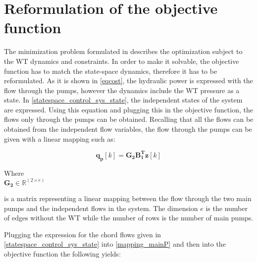 \section{Reformulation of the objective function}
\label{ObjFunc_reform}

The minimization problem formulated in  describes the optimization subject to the WT dynamics and constraints. In order to make it solvable, the objective function has to match the state-space dynamics, therefore it has to be reformulated. As it is shown in \eqref{eqcost}, the hydraulic power is expressed with the flow through the pumps, however the dynamics include the WT pressure as a state. In \eqref{statespace_control_sys_state}, the independent states of the system are expressed. Using this equation and plugging this in the objective function, the flows only through the pumps can be obtained. Recalling that all the flows can be obtained from the independent flow variables, the flow through the pumps can be given with a linear mapping such as: 

\begin{equation}
\bm{q_p}[k]  = \bm{G_{2}} \bm{B_{1}^T}  \bm{z}[k]
\label{mapping_mainP}
\end{equation}


\begin{minipage}[t]{0.20\textwidth}
Where\\
\hspace*{8mm} $\bm{G_{2}} \in \bm{\mathbb{R}}^{(2 \times e)} $ 
\end{minipage}
\begin{minipage}[t]{0.68\textwidth}
\vspace*{2mm}
is a matrix representing a linear mapping between the flow through the two main pumps and the independent flows in the system. The dimension $e$ is the number of edges without the WT while the number of rows is the number of main pumps. 
\end{minipage} 

Plugging the expression for the chord flows given in \eqref{statespace_control_sys_state} into \eqref{mapping_mainP} and then into the objective function the following yields:


